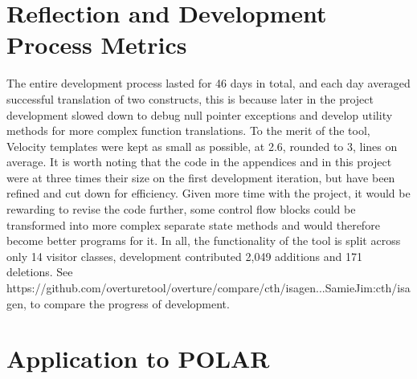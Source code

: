 \section{Reflection and Development Process Metrics}
The entire development process lasted for 46 days in total, and each day averaged successful translation of two constructs, this is because later in the project development slowed down to debug null pointer exceptions and develop utility methods for more complex function translations. To the merit of the tool, Velocity templates were kept as small as possible, at 2.6, rounded to 3, lines on average. It is worth noting that the code in the appendices and in this project were at three times their size on the first development iteration, but have been refined and cut down for efficiency. Given more time with the project, it would be rewarding to revise the code further, some control flow blocks could be transformed into more complex separate state methods and would therefore become better programs for it. In all, the functionality of the tool is split across only 14 visitor classes, development contributed 2,049 additions and 171 deletions. See https://github.com/overturetool/overture/compare/cth/isagen...SamieJim:cth/isagen, to compare the progress of development.

\section{Application to POLAR}


